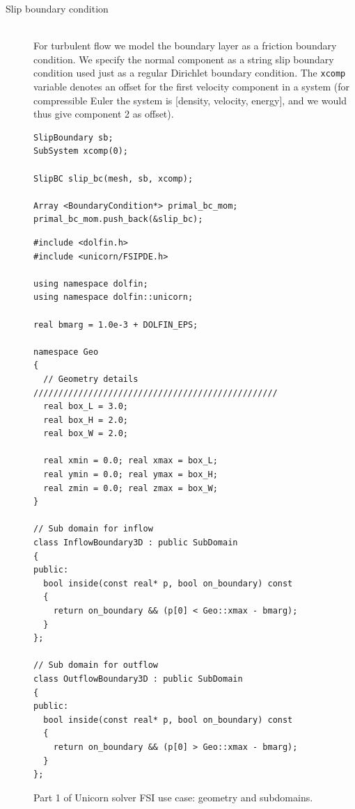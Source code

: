 \begin{description}

\item[Slip boundary condition]
\ \\
For turbulent flow we model the boundary layer as a friction boundary
condition. We specify the normal component as a string slip boundary
condition used just as a regular Dirichlet boundary condition. The
{\tt xcomp} variable denotes an offset for the first velocity
component in a system (for compressible Euler the system is [density,
velocity, energy], and we would thus give component 2 as offset).

\begin{lstlisting}
SlipBoundary sb;
SubSystem xcomp(0);

SlipBC slip_bc(mesh, sb, xcomp);

Array <BoundaryCondition*> primal_bc_mom;
primal_bc_mom.push_back(&slip_bc);
\end{lstlisting}


\end{description}


\begin{figure}[!h]
\begin{lstlisting}
#include <dolfin.h>
#include <unicorn/FSIPDE.h>

using namespace dolfin;
using namespace dolfin::unicorn;

real bmarg = 1.0e-3 + DOLFIN_EPS;

namespace Geo
{
  // Geometry details /////////////////////////////////////////////////
  real box_L = 3.0;
  real box_H = 2.0;
  real box_W = 2.0;

  real xmin = 0.0; real xmax = box_L;
  real ymin = 0.0; real ymax = box_H;
  real zmin = 0.0; real zmax = box_W;
}

// Sub domain for inflow
class InflowBoundary3D : public SubDomain
{
public:
  bool inside(const real* p, bool on_boundary) const
  {
    return on_boundary && (p[0] < Geo::xmax - bmarg);
  }
};

// Sub domain for outflow
class OutflowBoundary3D : public SubDomain
{
public:
  bool inside(const real* p, bool on_boundary) const
  {
    return on_boundary && (p[0] > Geo::xmax - bmarg);
  }
};
\end{lstlisting}
\caption{Part 1 of Unicorn solver FSI use case: geometry and subdomains.}
\end{figure}

